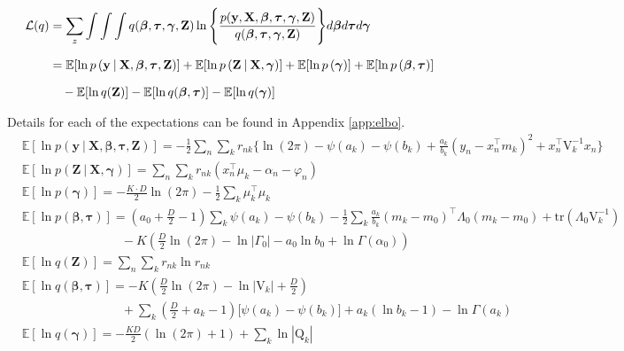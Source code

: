 \documentclass[twoside,11pt]{article}
\newcommand\given[1][]{\:#1\vert\:}
\newcommand{\transpose}[1]{#1^{\intercal}}
\newcommand{\nsum}{\sum_{n}}
\newcommand{\ksum}{\sum_{k}}
\newcommand{\boldbeta}{\boldsymbol\beta}
\newcommand{\boldgamma}{\boldsymbol\gamma}
\newcommand{\boldtau}{\boldsymbol\tau}
\newcommand{\E}{\mathbb{E}}
\newcommand{\pr}[1]{p \left( #1 \right)}
\begin{document}
\begin{equation} \label{eq:ELBO}
\setlength{\jot}{10pt}
\begin{split}
	\mathcal{L}(q) &= \sum_{z} \int \int \int q(\boldbeta, \boldtau, \boldgamma, \mathbf{Z})
	\ln \Bigg\{ \frac{p(\mathbf{y}, \mathbf{X}, \boldbeta, \boldtau, \boldgamma, \mathbf{Z})}{q(\boldbeta, \boldtau, \boldgamma, \mathbf{Z})}\Bigg\} d\boldbeta d\boldtau d\boldgamma \\
	&= \E[\ln\pr{\mathbf{y} \given \mathbf{X}, \boldbeta, \boldtau, \mathbf{Z}}] + 
	\E[\ln \pr{\mathbf{Z} \given \mathbf{X}, \boldgamma}] + \E[\ln \pr{\boldgamma}] + \E[\ln \pr{\boldbeta, \boldtau}] \\
	& \quad - \E[\ln q(\mathbf{Z})] - \E[\ln q(\boldbeta, \boldtau)] - \E[\ln q(\boldgamma)]
\end{split}
\end{equation}

Details for each of the expectations can be found in Appendix \ref{app:elbo}. 
\begin{align*}
	& \E[\ln\pr{\mathbf{y} \given \mathbf{X}, \boldbeta, \boldtau, \mathbf{Z}}] = -\frac{1}{2}\nsum \ksum r_{nk} \Big\{ \ln (2\pi) - \psi(a_k) - \psi(b_k)  + \frac{a_k}{b_k}(y_n - \transpose{x_n}m_k)^2 + \transpose{x_n}\mathrm{V}_k^{-1}x_n \Big\} \\
	 & \E[\ln \pr{\mathbf{Z} \given \mathbf{X}, \boldgamma}] = \nsum \ksum r_{nk} \left( \transpose{x_n}\mu_k - \alpha_n - \varphi_n \right) \\
	 & \E[\ln \pr{\boldgamma}] = - \frac{K \cdot D}{2} \ln (2\pi) - \frac{1}{2} \ksum \transpose{\mu_k}\mu_k \\
	 & \E[\ln \pr{\boldbeta, \boldtau}] = \left( a_0 + \frac{D}{2} - 1 \right) \ksum \psi(a_k) - \psi(b_k) - \frac{1}{2} \ksum \frac{a_k}{b_k} \transpose{(m_k - m_0)} \Lambda_0 (m_k - m_0) + \mathrm{tr} \left( \Lambda_0 \mathrm{V}_{k}^{-1}\right)\\
	   & \qquad \qquad \qquad \qquad - K \left(\frac{D}{2}\ln(2\pi)  - \ln |\Gamma_0| - a_0 \ln b_0 + \ln \Gamma(\alpha_0) \right) \\
	& \E[\ln q(\mathbf{Z})] =  \nsum \ksum r_{nk} \ln r_{nk} \\
	& \E[\ln q(\boldbeta, \boldtau)] = -K \left( \frac{D}{2} \ln(2\pi) - \ln |\mathrm{V}_{k}| + \frac{D}{2}\right) \\
	& \qquad \qquad \qquad \qquad + \ksum \left( \frac{D}{2} + a_k - 1 \right) \big[\psi(a_k) - \psi(b_k) \big] + a_k (\ln b_k - 1) - \ln \Gamma(a_k) \\
	& \E[\ln q(\boldgamma)] = - \frac{KD}{2}(\ln (2\pi) + 1) + \sum_{k} \ln|\mathrm{Q}_k|
\end{align*}
\end{document}
